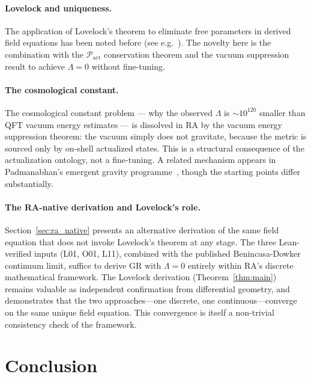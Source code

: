 \documentclass[11pt,a4paper]{article}
\newcommand{\Pact}{\mathcal{P}_{\mathrm{act}}}
\begin{document}
\paragraph{Lovelock and uniqueness.}
The application of Lovelock's theorem to eliminate free parameters in
derived field equations has been noted before (see e.g.~\citep{Padmanabhan2015}).
The novelty here is the combination with the $\Pact$ conservation
theorem and the vacuum suppression result to achieve $\Lambda = 0$
without fine-tuning.

\paragraph{The cosmological constant.}
The cosmological constant problem --- why the observed $\Lambda$ is
$\sim10^{120}$ smaller than QFT vacuum energy estimates --- is
dissolved in RA by the vacuum energy suppression theorem: the vacuum
simply does not gravitate, because the metric is sourced only by
on-shell actualized states. This is a structural consequence of the
actualization ontology, not a fine-tuning. A related mechanism appears
in Padmanabhan's emergent gravity programme~\citep{Padmanabhan2015},
though the starting points differ substantially.

\paragraph{The RA-native derivation and Lovelock's role.}
Section~\ref{sec:ra_native} presents an alternative derivation of the
same field equation that does not invoke Lovelock's theorem at any
stage. The three Lean-verified inputs (L01, O01, L11), combined with
the published Benincasa-Dowker continuum limit, suffice to derive GR
with $\Lambda = 0$ entirely within RA's discrete mathematical
framework. The Lovelock derivation (Theorem~\ref{thm:main}) remains
valuable as independent confirmation from differential geometry, and
demonstrates that the two approaches---one discrete, one
continuous---converge on the same unique field equation. This
convergence is itself a non-trivial consistency check of the framework.

\section{Conclusion}
\label{sec:conclusion}
\end{document}
